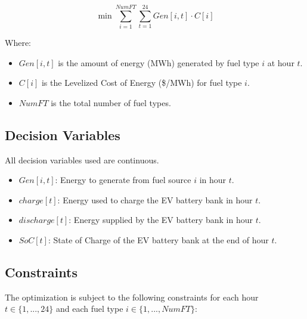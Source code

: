 \documentclass[12pt, letterpaper]{article}
\begin{document}
\begin{equation}
\min \sum_{i=1}^{NumFT} \sum_{t=1}^{24} Gen[i, t] \cdot C[i]
\end{equation}

Where:
\begin{itemize}
    \item $Gen[i, t]$ is the amount of energy (MWh) generated by fuel type $i$ at hour $t$.
    \item $C[i]$ is the Levelized Cost of Energy (\$/MWh) for fuel type $i$.
    \item $NumFT$ is the total number of fuel types.
\end{itemize}

\subsection{Decision Variables}
All decision variables used are continuous.
\begin{itemize}
    \item $Gen[i, t]$: Energy to generate from fuel source $i$ in hour $t$.
    \item $charge[t]$: Energy used to charge the EV battery bank in hour $t$.
    \item $discharge[t]$: Energy supplied by the EV battery bank in hour $t$.
    \item $SoC[t]$: State of Charge of the EV battery bank at the end of hour $t$.
\end{itemize}

\subsection{Constraints}
The optimization is subject to the following constraints for each hour $t \in \{1, ..., 24\}$ and each fuel type $i \in \{1, ..., NumFT\}$:
\end{document}
